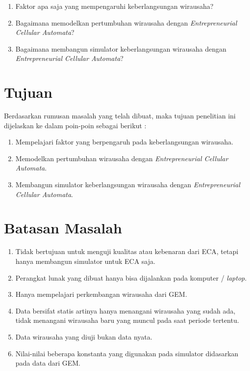 \begin{enumerate}
	\item Faktor apa saja yang mempengaruhi keberlangsungan wirausaha?
	\item Bagaimana memodelkan pertumbuhan wirausaha dengan \textit{Entrepreneurial Cellular Automata}?
	\item Bagaimana membangun simulator keberlangsungan wirausaha dengan \textit{Entrepreneurial Cellular Automata}?
\end{enumerate}



\section{Tujuan}
\label{sec:tujuan}
Berdasarkan rumusan masalah yang telah dibuat, maka tujuan penelitian ini dijelaskan ke dalam poin-poin sebagai berikut :


\begin{enumerate}
	\item Mempelajari faktor yang berpengaruh pada keberlangsungan wirausaha.
	\item Memodelkan pertumbuhan wirausaha dengan \textit{ Entrepreneurial Cellular Automata}.
	\item Membangun simulator keberlangsungan wirausaha dengan \textit{Entrepreneurial Cellular Automata}.
\end{enumerate}

\section{Batasan Masalah}
\label{sec:batasan}
\begin{enumerate}
	\item Tidak bertujuan untuk menguji kualitas atau kebenaran dari ECA, tetapi hanya membangun simulator untuk ECA saja.
	\item Perangkat lunak yang dibuat hanya bisa dijalankan pada komputer / \textit{laptop}.
	\item Hanya mempelajari perkembangan wirausaha dari GEM.
	\item Data bersifat statis artinya hanya menangani wirausaha yang sudah ada, tidak menangani wirausaha baru yang muncul pada saat periode tertentu. 
	\item Data wirausaha yang diuji bukan data nyata.
	\item Nilai-nilai beberapa konstanta yang digunakan pada simulator didasarkan pada data dari GEM.
\end{enumerate}


